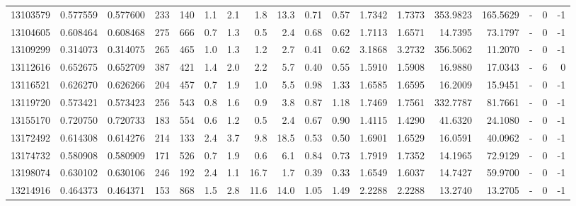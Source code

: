 \begin{tabular}{rrrrrrrrrrrrrrrlrr}
  13103579 & 0.577559 &   0.577600 &  233 &  140 &      1.1 &      2.1 &     1.8 &     13.3 &       0.71 &        0.57 &  1.7342 &  1.7373 &  353.9823 &  165.5629 &             - &        0 &         -1 \\
  13104605 & 0.608464 &   0.608468 &  275 &  666 &      0.7 &      1.3 &     0.5 &      2.4 &       0.68 &        0.62 &  1.7113 &  1.6571 &   14.7395 &   73.1797 &             - &        0 &         -1 \\
  13109299 & 0.314073 &   0.314075 &  265 &  465 &      1.0 &      1.3 &     1.2 &      2.7 &       0.41 &        0.62 &  3.1868 &  3.2732 &  356.5062 &   11.2070 &             - &        0 &         -1 \\
  13112616 & 0.652675 &   0.652709 &  387 &  421 &      1.4 &      2.0 &     2.2 &      5.7 &       0.40 &        0.55 &  1.5910 &  1.5908 &   16.9880 &   17.0343 &             - &        6 &          0 \\
  13116521 & 0.626270 &   0.626266 &  204 &  457 &      0.7 &      1.9 &     1.0 &      5.5 &       0.98 &        1.33 &  1.6585 &  1.6595 &   16.2009 &   15.9451 &             - &        0 &         -1 \\
  13119720 & 0.573421 &   0.573423 &  256 &  543 &      0.8 &      1.6 &     0.9 &      3.8 &       0.87 &        1.18 &  1.7469 &  1.7561 &  332.7787 &   81.7661 &             - &        0 &         -1 \\
  13155170 & 0.720750 &   0.720733 &  183 &  554 &      0.6 &      1.2 &     0.5 &      2.4 &       0.67 &        0.90 &  1.4115 &  1.4290 &   41.6320 &   24.1080 &             - &        0 &         -1 \\
  13172492 & 0.614308 &   0.614276 &  214 &  133 &      2.4 &      3.7 &     9.8 &     18.5 &       0.53 &        0.50 &  1.6901 &  1.6529 &   16.0591 &   40.0962 &             - &        0 &         -1 \\
  13174732 & 0.580908 &   0.580909 &  171 &  526 &      0.7 &      1.9 &     0.6 &      6.1 &       0.84 &        0.73 &  1.7919 &  1.7352 &   14.1965 &   72.9129 &             - &        0 &         -1 \\
  13198074 & 0.630102 &   0.630106 &  246 &  192 &      2.4 &      1.1 &    16.7 &      1.7 &       0.39 &        0.33 &  1.6549 &  1.6037 &   14.7427 &   59.9700 &             - &        0 &         -1 \\
  13214916 & 0.464373 &   0.464371 &  153 &  868 &      1.5 &      2.8 &    11.6 &     14.0 &       1.05 &        1.49 &  2.2288 &  2.2288 &   13.2740 &   13.2705 &             - &        0 &         -1 \\

\end{tabular}
